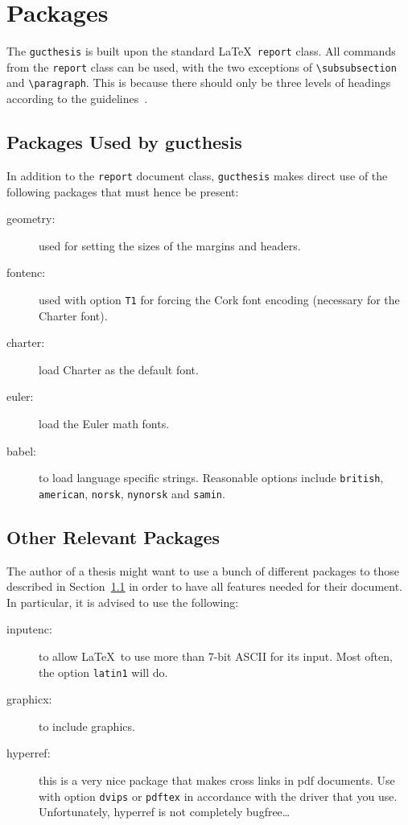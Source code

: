 \chapter{Packages}
\label{chap:packages}

The \texttt{gucthesis} is built upon the standard \LaTeX\
\texttt{report} class. All commands from the \texttt{report} class can
be used, with the two exceptions of \verb+\subsubsection+ and
\verb+\paragraph+. This is because there should only be three
levels of headings according to the guidelines~\cite{GUCMaster}.

\section{Packages Used by gucthesis}
\label{sec:packages}
In addition to the \texttt{report} document class,
\texttt{gucthesis} makes direct use of the following packages
that must hence be present:
\begin{description}
	\item[geometry:] used for setting the sizes of the margins and
  	headers.
	\item[fontenc:] used with option \texttt{T1} for forcing the Cork font
  	encoding (necessary for the Charter font).
	\item[charter:] load Charter as the default font.
	\item[euler:] load the Euler math fonts.
	\item[babel:] to load language specific strings. Reasonable options
	  include \texttt{british}, \texttt{american}, \texttt{norsk},
	  \texttt{nynorsk} and \texttt{samin}.
\end{description}

\section{Other Relevant Packages}
\label{sec:otherpackages}

The author of a thesis might want to use a bunch of different packages
to those described in Section~\ref{sec:packages} in order to have all features needed for their document. 
In particular, it is advised to use the following:
\begin{description}
	\item[inputenc:] to allow \LaTeX\ to use more than 7-bit ASCII for its
	  input. Most often, the option \texttt{latin1} will do.
	\item[graphicx:] to include graphics.
	\item[hyperref:] this is a very nice package that makes cross links in
	  pdf documents. Use with option \texttt{dvips} or \texttt{pdftex}
	  in accordance with the driver that you use. Unfortunately, hyperref
	  is not completely bugfree\dots
\end{description}

